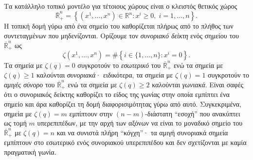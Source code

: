 \documentclass[11pt,a4paper,twoside,openright]{book}
\begin{document}
Τα κατάλληλο τοπικό μοντέλο για τέτοιους χώρους είναι ο κλειστός θετικός χώρος
\begin{equation}\label{eq:positive-orthant}
\bar{\mathbb{R}}^n_+ = \left\{ (x^1, \dots, x^n) \in \mathbb{R}^n : x^i \ge 0,\; i = 1, \dots, n \right\}.
\end{equation}
Η τοπική δομή γύρω από ένα σημείο του καθορίζεται πλήρως από το πλήθος των συντεταγμένων που μηδενίζονται.
Oρίζουμε τον \textit{συνοριακό δείκτη} ενός σημείου του $\bar{\mathbb{R}}^n_+$ ως
\begin{equation}\label{eq:boundary-index}
\zeta(x^1, \dots, x^n) = \#\left\{ i \in \{1, \dots, n\} : x^i = 0 \right\}.
\end{equation}
Τα σημεία με $\zeta(q) = 0$ συγκροτούν το \textit{εσωτερικό} του $\bar{\mathbb{R}}^n_+$ ενώ τα σημεία με $\zeta(q) \ge 1$
καλούνται \textit{συνοριακά}· ειδικότερα, 
τα σημεία με $\zeta(q) = 1$ συγκροτούν το \textit{αμιγές σύνορο} του $\bar{\mathbb{R}}^n_+$ ενώ τα σημεία με $\zeta(q) \ge 2$ καλούνται \textit{γωνιακά}. Είναι σαφές ότι ο συνοριακός δείκτης καθορίζει το είδος της γωνίας στην οποία εμπίπτει ένα σημείο και άρα καθορίζει τη δομή διαφορισιμότητας γύρω από αυτό. Συγκεκριμένα, σημεία με $\zeta(q)=m$ εμπίπτουν στην $(n-m)$-διάστατη ``εσοχή'' που ανακύπτει ως τομή $m$ υπερεπιπέδων, με την αρχή των αξόνων να είναι το μοναδικό σημείο του $\bar{\mathbb{R}}^n_+$ με $\zeta(q) = n$ και να συνιστά πλήρη ``κόγχη''· τα αμιγή συνοριακά σημεία εμπίπτουν στο εσωτερικό ενός συνοριακού υπερεπιπέδου και δεν σχετίζονται με καμία πραγματική γωνία.
\end{document}
